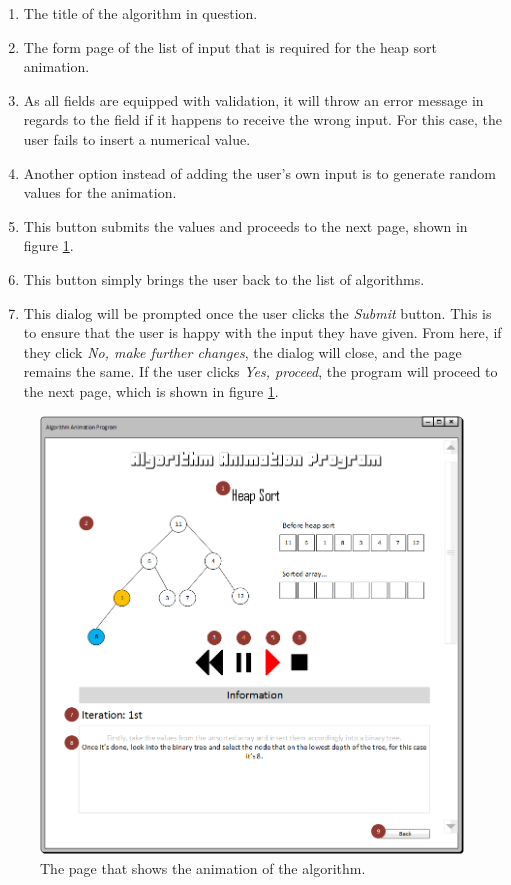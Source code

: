 \begin{enumerate}
\item The title of the algorithm in question.
\item The form page of the list of input that is required for the heap sort animation.
\item As all fields are equipped with validation, it will throw an error message in regards to the field if it happens to receive the wrong input. For this case, the user fails to insert a numerical value.
\item Another option instead of adding the user's own input is to generate random values for the animation.
\item This button submits the values and proceeds to the next page, shown in figure \ref{uiAnimation}.
\item This button simply brings the user back to the list of algorithms.
\item This dialog will be prompted once the user clicks the \textit{Submit} button. This is to ensure that the user is happy with the input they have given. From here, if they click \textit{No, make further changes}, the dialog will close, and the page remains the same. If the user clicks \textit{Yes, proceed}, the program will proceed to the next page, which is shown in figure \ref{uiAnimation}.
\end{enumerate}

\begin{figure}[H]
\centering
\hspace*{-0.5cm}
\includegraphics[scale=0.8]{images/report_images/uiAnimation.png}
\caption{The page that shows the animation of the algorithm.}
\label{uiAnimation}
\end{figure}

